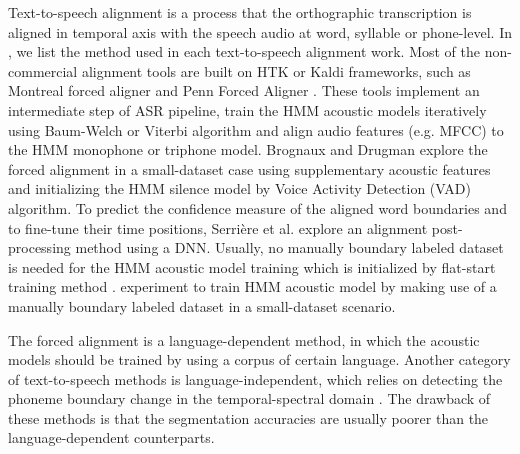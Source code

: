 Text-to-speech alignment is a process that the orthographic transcription is aligned in temporal axis with the speech audio at word, syllable or phone-level. In , we list the method used in each text-to-speech alignment work. Most of the non-commercial alignment tools are built on \gls{HTK}  or Kaldi  frameworks, such as Montreal forced aligner  and Penn Forced Aligner . These tools implement an intermediate step of \gls{ASR} pipeline, train the \gls{HMM} acoustic models iteratively using Baum-Welch or Viterbi algorithm and align audio features (e.g. \gls{MFCC}) to the \gls{HMM} monophone or triphone model. Brognaux and Drugman  explore the forced alignment in a small-dataset case using supplementary acoustic features and initializing the \gls{HMM} silence model by Voice Activity Detection (VAD) algorithm. To predict the confidence measure of the aligned word boundaries and to fine-tune their time positions, Serri\`{e}re et al.  explore an alignment post-processing method using a \gls{DNN}. Usually, no manually boundary labeled dataset is needed for the \gls{HMM} acoustic model training which is initialized by flat-start training method .  experiment to train \gls{HMM} acoustic model by making use of a manually boundary labeled dataset in a small-dataset scenario.

The forced alignment is a language-dependent method, in which the acoustic models should be trained by using a corpus of certain language. Another category of text-to-speech methods is language-independent, which relies on detecting the phoneme boundary change in the temporal-spectral domain . The drawback of these methods is that the segmentation accuracies are usually poorer than the language-dependent counterparts. 

